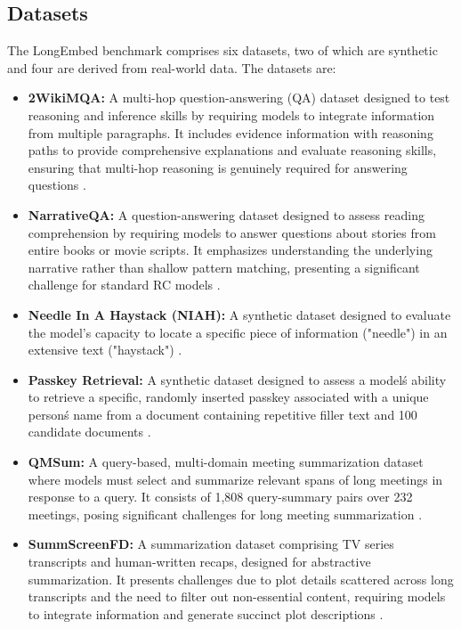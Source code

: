 \subsection{Datasets}
The LongEmbed benchmark comprises six datasets, two of which are synthetic and four are derived from real-world data. The datasets are:
\begin{itemize}
    \item \textbf{2WikiMQA:} A multi-hop question-answering (QA) dataset designed to test reasoning and inference skills by requiring models to integrate information from multiple paragraphs. It includes evidence information with reasoning paths to provide comprehensive explanations and evaluate reasoning skills, ensuring that multi-hop reasoning is genuinely required for answering questions \autocite{ho2020constructingmultihopqadataset}.
    \item \textbf{NarrativeQA:} A question-answering dataset designed to assess reading comprehension by requiring models to answer questions about stories from entire books or movie scripts. It emphasizes understanding the underlying narrative rather than shallow pattern matching, presenting a significant challenge for standard RC models \autocite{kočiský2017narrativeqareadingcomprehensionchallenge}.
    \item \textbf{Needle In A Haystack (NIAH):} A synthetic dataset designed to evaluate the model's capacity to locate a specific piece of information ("needle") in an extensive text ("haystack") \autocite{nelson2024needlehaystackmemorybased}.
    \item \textbf{Passkey Retrieval:} A synthetic dataset designed to assess a model\'s ability to retrieve a specific, randomly inserted passkey associated with a unique person\'s name from a document containing repetitive filler text and 100 candidate documents \autocite{Wang2023ImprovingTE}. 
    \item \textbf{QMSum:} A query-based, multi-domain meeting summarization dataset where models must select and summarize relevant spans of long meetings in response to a query. It consists of 1,808 query-summary pairs over 232 meetings, posing significant challenges for long meeting summarization \autocite{zhong2021qmsumnewbenchmarkquerybased}. 
    \item \textbf{SummScreenFD:} A summarization dataset comprising TV series transcripts and human-written recaps, designed for abstractive summarization. It presents challenges due to plot details scattered across long transcripts and the need to filter out non-essential content, requiring models to integrate information and generate succinct plot descriptions \autocite{chen2022summscreendatasetabstractivescreenplay}. 
\end{itemize}

